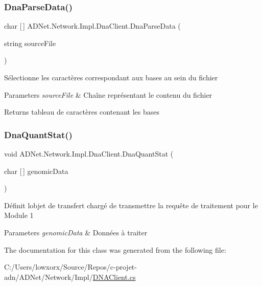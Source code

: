 \subsubsection{\texorpdfstring{Dna\+Parse\+Data()}{DnaParseData()}}
{\footnotesize\ttfamily char \mbox{[}$\,$\mbox{]} A\+D\+Net.\+Network.\+Impl.\+Dna\+Client.\+Dna\+Parse\+Data (\begin{DoxyParamCaption}\item[{string}]{source\+File }\end{DoxyParamCaption})}



Sélectionne les caractères correspondant aux bases au sein du fichier 


\begin{DoxyParams}{Parameters}
{\em source\+File} & Chaîne représentant le contenu du fichier\\
\hline
\end{DoxyParams}
\begin{DoxyReturn}{Returns}
tableau de caractères contenant les bases
\end{DoxyReturn}
\mbox{\label{class_a_d_net_1_1_network_1_1_impl_1_1_dna_client_af490dfa3abbce0400e5541e0a44f4b27}} 
\subsubsection{\texorpdfstring{Dna\+Quant\+Stat()}{DnaQuantStat()}}
{\footnotesize\ttfamily void A\+D\+Net.\+Network.\+Impl.\+Dna\+Client.\+Dna\+Quant\+Stat (\begin{DoxyParamCaption}\item[{char \mbox{[}$\,$\mbox{]}}]{genomic\+Data }\end{DoxyParamCaption})}



Définit l\textquotesingle{}objet de transfert chargé de transmettre la requête de traitement pour le Module 1 


\begin{DoxyParams}{Parameters}
{\em genomic\+Data} & Données à traiter\\
\hline
\end{DoxyParams}


The documentation for this class was generated from the following file\+:\begin{DoxyCompactItemize}
\item 
C\+:/\+Users/lowxorx/\+Source/\+Repos/c-\/projet-\/adn/\+A\+D\+Net/\+Network/\+Impl/\hyperlink{_d_n_a_client_8cs}{D\+N\+A\+Client.\+cs}\end{DoxyCompactItemize}
